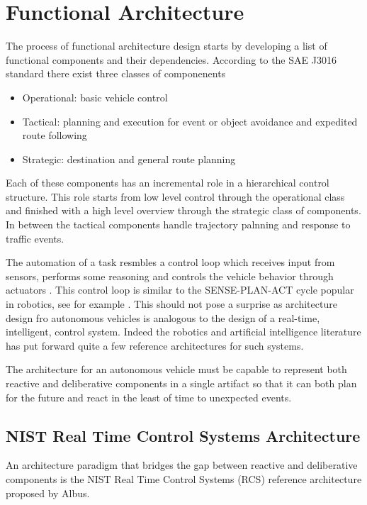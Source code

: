\section{Functional Architecture}
\label{functional_architecture}

The process of functional architecture design starts by developing a list of functional components and their dependencies. 
According to the SAE J3016 standard there exist three classes of componenents

\begin{itemize}
\item Operational: basic vehicle control
\item Tactical: planning and execution for event or object avoidance and expedited route following  
\item Strategic: destination and general route planning
\end{itemize}

Each of these components has an incremental role in a hierarchical control structure. 
This role starts from low level control through the operational class and finished with a high level overview through the strategic
class of components. In between the tactical components handle trajectory palnning and response to traffic events.


The automation of a task resmbles a control loop which receives input from sensors, performs some reasoning and controls the vehicle 
behavior through actuators \cite{Serban}. This control loop is similar to the SENSE-PLAN-ACT cycle popular in robotics, see for example \cite{Murphy2000}. 
This should not pose a surprise as architecture design fro autonomous vehicles is analogous to the design of a real-time, intelligent, control system. 
Indeed the robotics and artificial intelligence literature has put forward quite a few reference architectures for such systems.


The architecture for an autonomous vehicle must be capable to represent both reactive and deliberative components in a single artifact so that it can both plan 
for the future and react in the least of time to unexpected events.


\subsection{NIST Real Time Control Systems Architecture}
An architecture paradigm that bridges the gap between reactive and deliberative components is the NIST Real Time Control Systems (RCS) reference architecture
proposed by Albus. 

